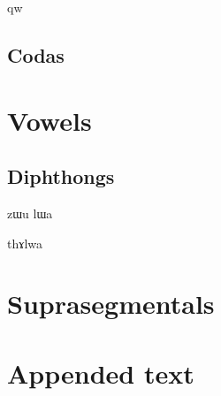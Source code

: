 qw\documentclass[oldfontcommands,oneside,a4paper,11pt]{article}
\begin{document}
      \subsection{Codas} \label{sec:coda}
    
    
     \section{Vowels} \label{sec:vowels}
     
          \subsection{Diphthongs}
     zɯu
     lɯa
     
     thɤlwa
     
     \section{Suprasegmentals}
     
         
     \section{Appended text}


\end{document}
